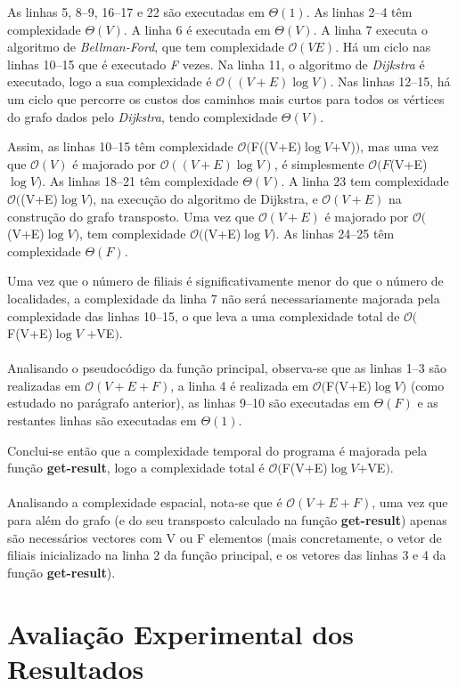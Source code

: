 \documentclass[12pt,a4paper,notitlepage]{article}
\renewcommand{\O}[1]{$\mathcal{O}(#1)$}
\begin{document}
As linhas 5, 8--9, 16--17 e 22 são executadas em $\Theta(1)$.
As linhas 2--4 têm complexidade $\Theta(V)$.
A linha 6 é executada em $\Theta(V)$.
A linha 7 executa o algoritmo de \emph{Bellman-Ford}, que tem complexidade \O{VE}.
Há um ciclo nas linhas 10--15 que é executado \emph{F} vezes.
Na linha 11, o algoritmo de \emph{Dijkstra} é executado, logo a sua complexidade é \O{(V+E)\log{V}}.
Nas linhas 12--15, há um ciclo que percorre os custos dos caminhos mais curtos para todos os vértices do grafo dados pelo \emph{Dijkstra}, tendo complexidade $\Theta(V)$.

Assim, as linhas 10--15 têm complexidade \O{$F((V+E)$\log{V}$+V)$}, mas uma vez que \O{V} é majorado por \O{(V+E)\log{V}}, é simplesmente \O{F$(V+E)$\log{V}}.
As linhas 18--21 têm complexidade $\Theta(V)$.
A linha 23 tem complexidade \O{$(V+E)$\log{V}}, na execução do algoritmo de Dijkstra, e \O{V+E} na construção do grafo transposto. Uma vez que \O{V+E} é majorado por \O{$(V+E)$\log{V}}, tem complexidade \O{$(V+E)$\log{V}}.
As linhas 24--25 têm complexidade $\Theta(F)$.

Uma vez que o número de filiais é significativamente menor do que o número de localidades, a complexidade da linha 7 não será necessariamente majorada pela complexidade das linhas 10--15, o que leva a uma complexidade total de \O{$F(V+E)$\log{V}$ +VE$}.
\\
\\
Analisando o pseudocódigo da função principal, observa-se que as linhas 1--3 são realizadas em \O{V+E+F}, a linha 4 é realizada em \O{$F(V+E)$\log{V}} (como estudado no parágrafo anterior), as linhas 9--10 são executadas em $\Theta(F)$ e as restantes linhas são executadas em $\Theta(1)$.

Conclui-se então que a complexidade temporal do programa é majorada pela função \textbf{get-result}, logo a complexidade total é \O{$F(V+E)$\log{V}$+VE$}.
\\
\\
Analisando a complexidade espacial, nota-se que é \O{V+E+F}, uma vez que para além do grafo (e do seu transposto calculado na função \textbf{get-result}) apenas são necessários vectores com V ou F elementos (mais concretamente, o vetor de filiais inicializado na linha 2 da função principal, e os vetores das linhas 3 e 4 da função \textbf{get-result}).

\section{Avaliação Experimental dos Resultados}
\end{document}
